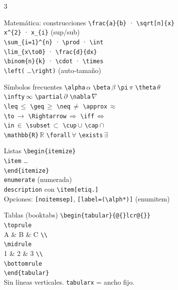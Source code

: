 \documentclass[9pt,a4paper,landscape]{extarticle}
\newcommand{\K}[1]{\texttt{\textbackslash #1}}
\begin{document}
\begin{multicols}{3}
\begin{blk}{Matemática: construcciones}
\K{frac\{a\}\{b\}} · \K{sqrt[n]\{x\}}\\
\texttt{x\^{}\{2\}} · \texttt{x\_\{i\}} (sup/sub)\\
\K{sum\_\{i=1\}\^{}\{n\}} · \K{prod} · \K{int}\\
\K{lim\_\{x\textbackslash to0\}} · \K{frac\{d\}\{dx\}}\\
\K{binom\{n\}\{k\}} · \K{cdot} · \K{times}\\
\K{left(} \dots \K{right)} {\footnotesize(auto-tamaño)}
\end{blk}

\begin{blk}{Símbolos frecuentes}
\K{alpha}\,$\alpha$ \K{beta}\,$\beta$ \K{pi}\,$\pi$ \K{theta}\,$\theta$\\
\K{infty}\,$\infty$ \K{partial}\,$\partial$ \K{nabla}\,$\nabla$\\
\K{leq}\,$\leq$ \K{geq}\,$\geq$ \K{neq}\,$\neq$ \K{approx}\,$\approx$\\
\K{to}\,$\to$ \K{Rightarrow}\,$\Rightarrow$ \K{iff}\,$\iff$\\
\K{in}\,$\in$ \K{subset}\,$\subset$ \K{cup}\,$\cup$ \K{cap}\,$\cap$\\
\K{mathbb\{R\}}\,$\mathbb{R}$ \K{forall}\,$\forall$ \K{exists}\,$\exists$
\end{blk}

\begin{blk}{Listas}
\texttt{\textbackslash begin\{itemize\}}\\
\hspace*{1em}\K{item} \dots\\
\texttt{\textbackslash end\{itemize\}}\\[2pt]
\texttt{enumerate} (numerada)\\
\texttt{description} con \K{item[etiq.]}\\
Opciones: \texttt{[noitemsep]}, \texttt{[label=(\textbackslash alph*)]} (enumitem)
\end{blk}

\begin{blk}{Tablas (booktabs)}
\texttt{\textbackslash begin\{tabular\}\{@\{\}lcr@\{\}\}}\\
\hspace*{0.5em}\K{toprule}\\
\hspace*{0.5em}A \& B \& C \texttt{\textbackslash\textbackslash}\\
\hspace*{0.5em}\K{midrule}\\
\hspace*{0.5em}1 \& 2 \& 3 \texttt{\textbackslash\textbackslash}\\
\hspace*{0.5em}\K{bottomrule}\\
\texttt{\textbackslash end\{tabular\}}\\[2pt]
{\footnotesize Sin líneas verticales. \texttt{tabularx} = ancho fijo.}
\end{blk}


\end{multicols}
\end{document}
